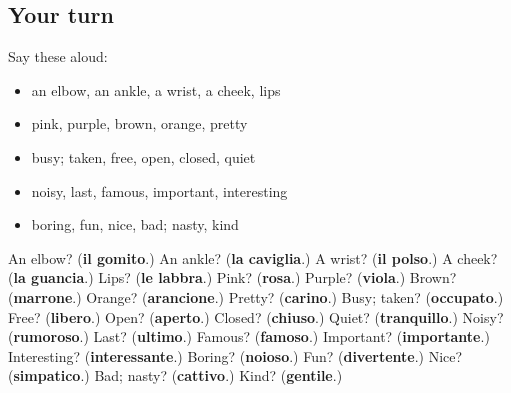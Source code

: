 \subsection*{Your turn}
Say these aloud:

\begin{itemize}
\raggedright
  \item an elbow, an ankle, a wrist, a cheek, lips
  \item pink, purple, brown, orange, pretty
  \item busy; taken, free, open, closed, quiet
  \item noisy, last, famous, important, interesting
  \item boring, fun, nice, bad; nasty, kind
\end{itemize}

\begin{tcolorbox}[breakable,colback=teal!4,colframe=teal!35!black,title={Before you move on}]
An elbow? (\textbf{il gomito}.) An ankle? (\textbf{la caviglia}.) A wrist? (\textbf{il polso}.) A cheek? (\textbf{la guancia}.) Lips? (\textbf{le labbra}.) Pink? (\textbf{rosa}.) Purple? (\textbf{viola}.) Brown? (\textbf{marrone}.) Orange? (\textbf{arancione}.) Pretty? (\textbf{carino}.) Busy; taken? (\textbf{occupato}.) Free? (\textbf{libero}.) Open? (\textbf{aperto}.) Closed? (\textbf{chiuso}.) Quiet? (\textbf{tranquillo}.) Noisy? (\textbf{rumoroso}.) Last? (\textbf{ultimo}.) Famous? (\textbf{famoso}.) Important? (\textbf{importante}.) Interesting? (\textbf{interessante}.) Boring? (\textbf{noioso}.) Fun? (\textbf{divertente}.) Nice? (\textbf{simpatico}.) Bad; nasty? (\textbf{cattivo}.) Kind? (\textbf{gentile}.)
\end{tcolorbox}

